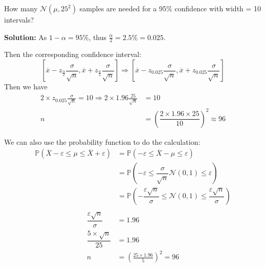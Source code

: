 \begin{eg}
  How many \(\mathcal{N}(\mu, 25^2)\) samples are needed for a 95\% confidence with width = 10 intervals?

  \textbf{Solution:} 
  As \(1 - \alpha = 95\%\), thus \(\frac{\alpha}{2} = 2.5\% = 0.025\). 

  Then the corresponding confidence interval: 
  \[
  \left[\overline{x} - z_{\frac{\alpha}{2}} \frac{\sigma}{\sqrt{n}}, \overline{x} + z_{\frac{\alpha}{2}} \frac{\sigma}{\sqrt{n}}\right] \Longrightarrow 
  \left[\overline{x} - z_{0.025} \frac{\sigma}{\sqrt{n}}, \overline{x} + z_{0.025} \frac{\sigma}{\sqrt{n}}\right]
  \]
  Then we have
  \[
  \begin{aligned}
    2 \times z_{0.025} \frac{\sigma}{\sqrt{n}} = 10 \Longrightarrow 2 \times 1.96 \frac{25}{\sqrt{n}} &= 10 \\
    n &= \left(\dfrac{2 \times 1.96 \times 25}{10}\right)^2 \approx 96
  \end{aligned}
  \]

  \begin{remark}
    We can also use the probability function to do the calculation: 
    \[
      \begin{aligned}
        \mathbb{P}\left(\overline{X} - \varepsilon \leq \mu \leq \overline{X} + \varepsilon\right) &= \mathbb{P}\left(- \varepsilon \leq \overline{X} - \mu \leq \varepsilon\right) \\
        &= \mathbb{P}\left(- \varepsilon \leq \dfrac{\sigma}{\sqrt{n}} \mathcal{N}(0, 1) \leq \varepsilon\right) \\
        &= \mathbb{P}\left(-\dfrac{\varepsilon\sqrt{n}}{\sigma} \leq \mathcal{N}(0, 1) \leq \dfrac{\varepsilon\sqrt{n}}{\sigma}\right) \\
      \end{aligned}
    \]
    \[
    \begin{aligned}
      \dfrac{\varepsilon\sqrt{n}}{\sigma} &= 1.96 \\
      \dfrac{5 \times \sqrt{n}}{25} &= 1.96 \\
      n &= \left(\frac{25 \times 1.96}{5}\right)^2 = 96\\
    \end{aligned}
    \]
  \end{remark}
\end{eg}


